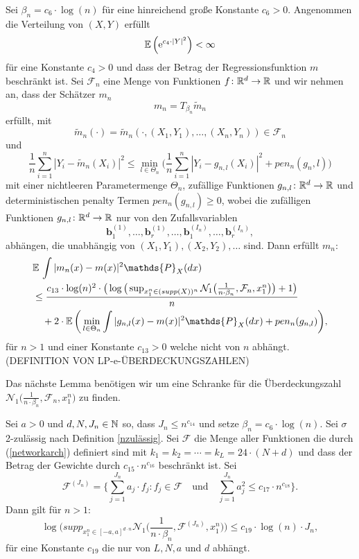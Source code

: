   \begin{lem}
  \label{lem:8}
Sei $\beta_n = c_6 \cdot \log(n)$ für eine hinreichend große Konstante $c_6 > 0$. Angenommen die Verteilung von $(X, Y)$ erfüllt 
$$ \mathbb{E}\,\Big(\mathrm{e}^{c_4 \cdot |Y|^2}\Big) < \infty$$
für eine Konstante $c_4 > 0$ und dass der Betrag der Regressionsfunktion $m$ beschränkt ist. Sei $\mathcal{F}_n$ eine Menge von Funktionen $f\colon \mathbb{R}^d \to \mathbb{R}$ und wir nehmen an, dass der Schätzer $m_n$ 
$$m_n = T_{\beta_n}\tilde{m}_n$$ 
erfüllt, mit 
$$\tilde{m}_n(\cdot) = \tilde{m}_n(\cdot,(X_1, Y_1),\dots,(X_n, Y_n)) \in \mathcal{F}_n$$
und 
$$\frac{1}{n} \sum_{i = 1}^n |Y_i - \tilde{m}_n(X_i)|^2 \leq \min_{l \in \Theta_n}\bigg(\frac{1}{n}\sum_{i = 1}^n |Y_i - g_{n,l}(X_i)|^2 + pen_n(g_n,l)\bigg)$$
mit einer nichtleeren Parametermenge $\Theta_n$, zufällige Funktionen $g_{n,l}\colon \mathbb{R}^d \to \mathbb{R}$ und deterministischen penalty Termen $pen_n(g_{n,l}) \geq 0$, wobei die zufälligen Funktionen $g_{n,l}\colon \mathbb{R}^d \to \mathbb{R}$ nur von den Zufallsvariablen
$$\mathbf{b}_1^{(1)},\dots,\mathbf{b}_r^{(1)},\dots,\mathbf{b}_1^{(I_n)},\dots,\mathbf{b}_r^{(I_n)},$$
abhängen, die unabhängig von $(X_1, Y_1), (X_2, Y_2),\dots$ sind.
Dann erfüllt $m_n\colon$
\begin{equation*}
\begin{split}
& \E \int |m_n(x) - m(x)|^2 \mathds{P}_X(dx) \\
& \leq \frac{c_{13} \cdot \log(n)^2 \cdot \big(\log\big(\sup_{x_1^n \in (supp(X))^n}\mathcal{N}_1\big(\frac{1}{n \cdot \beta_n},\mathcal{F}_n,x_1^n\big)\big) + 1\big)}{n} \\
& \quad + 2 \cdot \E\bigg(\min_{l \in \Theta_n} \int |g_{n,l}(x) - m(x)|^2 \mathds{P}_X(dx) + pen_n(g_{n,l})\bigg),
\end{split}
\end{equation*}
für $n > 1$ und einer Konstante $c_{13} > 0$ welche nicht von $n$ abhängt. (DEFINITION VON LP-e-ÜBERDECKUNGSZAHLEN)
  \end{lem}
Das nächste Lemma benötigen wir um eine Schranke für die Überdeckungszahl $\mathcal{N}_1\big(\frac{1}{n \cdot \beta_n},\mathcal{F}_n,x_1^n\big)$ zu finden.
\begin{lem}
\label{lem:9}
Sei $a > 0$ und $d, N, J_n \in \mathbb{N}$ so, dass $J_n \leq n^{c_{14}}$ und setze $\beta_n = c_6 \cdot \log(n).$
Sei $\sigma$ 2-zulässig nach Definition \ref{nzulässig}. Sei $\mathcal{F}$ die Menge aller Funktionen die durch (\ref{networkarch}) definiert sind mit $k_1 = k_2 = \cdots = k_L = 24 \cdot (N + d)$ und dass der Betrag der Gewichte durch $c_{15} \cdot n^{c_{16}}$ beschränkt ist. Sei
$$ \mathcal{F}^{(J_n)} = \biggl\{\sum_{j = 1}^{J_n} a_j \cdot f_j : f_j \in \mathcal{F} \quad \text{und} \quad \sum_{j = 1}^{J_n} a_j^2 \leq c_{17} \cdot n^{c_{18}}\biggr\}.$$
Dann gilt für $n > 1:$
$$\log\bigg(supp_{x_1^n\in[-a,a]^{d \cdot n}} \mathcal{N}_1\bigg(\frac{1}{n \cdot \beta_n}, \mathcal{F}^{(J_n)},x_1^n\bigg)\bigg) \leq c_{19} \cdot \log(n) \cdot J_n,$$
für eine Konstante $c_{19}$ die nur von $L, N, a$ und $d$ abhängt.
\end{lem}